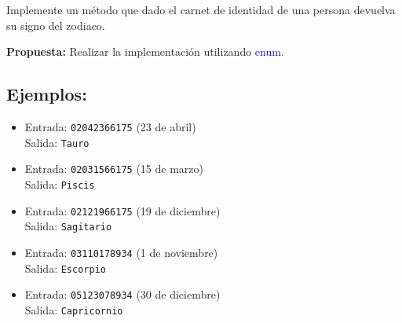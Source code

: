 Implemente un método que dado el carnet de identidad de una persona devuelva su signo del zodiaco.

\textbf{Propuesta:} Realizar la implementación utilizando \textcolor{blue}{enum}.

\subsection*{Ejemplos:}
\begin{itemize}
    \item Entrada: \texttt{02042366175} (23 de abril)\\
          Salida: \texttt{Tauro}
    \item Entrada: \texttt{02031566175} (15 de marzo)\\
          Salida: \texttt{Piscis}
    \item Entrada: \texttt{02121966175} (19 de diciembre)\\
          Salida: \texttt{Sagitario}
    \item Entrada: \texttt{03110178934} (1 de noviembre)\\
          Salida: \texttt{Escorpio}
    \item Entrada: \texttt{05123078934} (30 de diciembre)\\
          Salida: \texttt{Capricornio}
\end{itemize}


